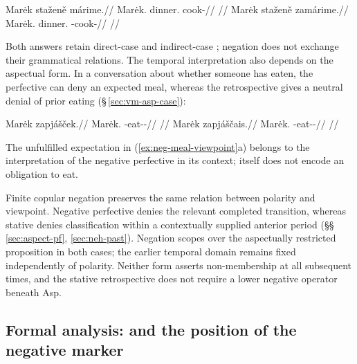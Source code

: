 \pex\label{ex:neg-dinner-progressive}
\a
\begingl
\gla Marėk staženě márime.//
\glb Marėk.\Dir{} dinner.\Ind{} cook-\Prog{}//
\glft {}
//
\endgl
\a
\begingl
\gla Marėk staženě zamárime.//
\glb Marėk.\Dir{} dinner.\Ind{} \Neg{}-cook-\Prog{}//
\glft {}
//
\endgl
\xe

Both answers retain direct-case  and indirect-case
; negation does not exchange their grammatical relations.
The temporal interpretation also depends on the aspectual form. In a
conversation about whether someone has eaten, the perfective can deny an
expected meal, whereas the retrospective gives a neutral denial of prior
eating (§\,\ref{sec:vm-asp-case}):

\pex\label{ex:neg-meal-viewpoint}
\a
\begingl
\gla Marėk zapjášček.//
\glb Marėk.\Dir{} \Neg{}-eat-\Antip{}-\Pf{}//
\glft {}
//
\endgl
\a
\begingl
\gla Marėk zapjáščais.//
\glb Marėk.\Dir{} \Neg{}-eat-\Antip{}-\Ret{}//
\glft {}
//
\endgl
\xe

The unfulfilled expectation in (\ref{ex:neg-meal-viewpoint}a) belongs to
the interpretation of the negative perfective in its context; 
itself does not encode an obligation to eat.

Finite copular negation preserves the same relation between polarity and
viewpoint. Negative perfective  denies the relevant completed transition, whereas
stative  denies classification within a contextually supplied
anterior period (§§\,\ref{sec:aspect-pf}, \ref{sec:neh-past}). Negation
scopes over the aspectually restricted proposition in both cases; the
earlier temporal domain remains fixed independently of polarity. Neither
form asserts non-membership at all subsequent times, and the stative
retrospective does not require a lower negative operator beneath Asp.

\subsection{Formal analysis:  and the position of the negative marker}
\label{sec:vm-neg}
\label{sec:vm-neg-exponents}

